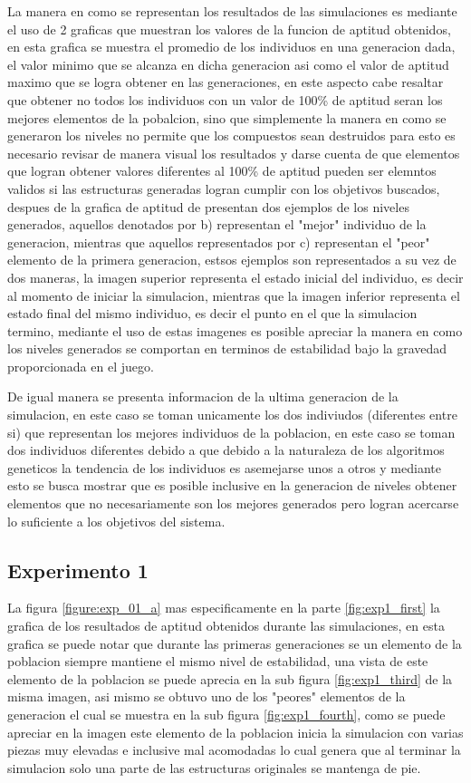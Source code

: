 La manera en como se representan los resultados de las simulaciones es mediante
el uso de 2 graficas que muestran los valores de la funcion de aptitud
obtenidos, en esta grafica se muestra el promedio de los individuos en una
generacion dada, el valor minimo que se alcanza en dicha generacion asi como el
valor de aptitud maximo que se logra obtener en las generaciones, en este
aspecto cabe resaltar que obtener no todos los individuos con un valor de 100\%
de aptitud seran los mejores elementos de la pobalcion, sino que simplemente la
manera en como se generaron los niveles no permite que los compuestos sean
destruidos para esto es necesario revisar de manera visual los resultados y
darse cuenta de que elementos que logran obtener valores diferentes al 100\% de
aptitud pueden ser elemntos validos si las estructuras generadas logran cumplir
con los objetivos buscados, despues de la grafica de aptitud de presentan dos
ejemplos de los niveles generados, aquellos denotados por b) representan el
"mejor" individuo de la generacion, mientras que aquellos representados por c)
representan el "peor" elemento de la primera generacion, estsos ejemplos son
representados a su vez de dos maneras, la imagen superior representa el estado
inicial del individuo, es decir al momento de iniciar la simulacion, mientras
que la imagen inferior representa el estado final del mismo individuo, es decir
el punto en el que la simulacion termino, mediante el uso de estas imagenes es
posible apreciar la manera en como los niveles generados se comportan en
terminos de estabilidad bajo la gravedad proporcionada en el juego.

De igual manera se presenta informacion de la ultima generacion de la
simulacion, en este caso se toman unicamente los dos indiviudos (diferentes
entre si) que representan los mejores individuos de la poblacion, en este caso
se toman dos individuos diferentes debido a que debido a la naturaleza de los
algoritmos geneticos la tendencia de los individuos es asemejarse unos a otros y
mediante esto se busca mostrar que es posible inclusive en la generacion de
niveles obtener elementos que no necesariamente son los mejores generados pero
logran acercarse lo suficiente a los objetivos del sistema.

\subsection{Experimento 1}
\label{chap6:exp_1}

La figura \ref{figure:exp_01_a} mas especificamente en la parte
\ref{fig:exp1_first} la grafica de los resultados de aptitud obtenidos durante
las simulaciones, en esta grafica se puede notar que durante las primeras
generaciones se un elemento de la poblacion siempre mantiene el mismo nivel de
estabilidad, una vista de este elemento de la poblacion se puede aprecia en la
sub figura \ref{fig:exp1_third} de la misma imagen, asi mismo se obtuvo uno de
los "peores" elementos de la generacion el cual se muestra en la sub figura
\ref{fig:exp1_fourth}, como se puede apreciar en la imagen este elemento de la
poblacion inicia la simulacion con varias piezas muy elevadas e inclusive mal
acomodadas lo cual genera que al terminar la simulacion solo una parte de las
estructuras originales se mantenga de pie.

